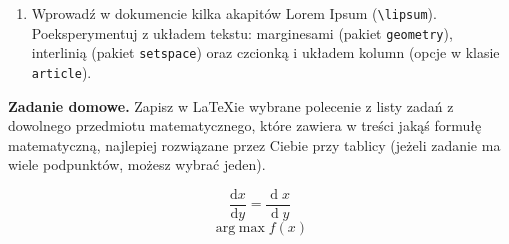 \documentclass[12pt, letterpaper, fleqn, leqno]{article}
\begin{document}
\begin{enumerate}
    \begin{enumerate}
        \item \begin{equation}
            \begin{cases}
                x+y=3\\
                x-2y=0
            \end{cases}
        \end{equation}
        \item \begin{equation} 
        \sqrt{x^2} = \begin{cases}
                x, & \text{gdy } x\geq 0,\\
                -x, & \text{gdy} x<0.
            \end{cases}
        \end{equation}
        Zwróć uwagę, na wyrównanie tekstu opisującego warunek (wskazówka: użyj \verb|&|), oraz na czcionkę (\verb|\text{}| wewnątrz trybu matematycznego.).
    \end{enumerate}
    \item Wprowadź w dokumencie kilka akapitów Lorem Ipsum (\verb|\lipsum|). Poeksperymentuj z układem tekstu: marginesami (pakiet \verb|geometry|), interlinią (pakiet \verb|setspace|) oraz czcionką i układem kolumn (opcje w klasie \verb|article|).
\end{enumerate} 
%
\textbf{Zadanie domowe.} Zapisz w \LaTeX ie wybrane polecenie z listy zadań z dowolnego przedmiotu matematycznego, które zawiera w treści jakąś formułę matematyczną, najlepiej rozwiązane przez Ciebie przy tablicy (jeżeli zadanie ma wiele podpunktów, możesz wybrać jeden).

\newpage
\begin{equation}
    \frac{\mathrm{d}x}{\mathrm{d}y} = \frac{\operatorname{d}x}{\operatorname{d}y}
\end{equation}
\begin{equation}
    \operatorname{arg\;max} f(x)
\end{equation}
\end{document}
